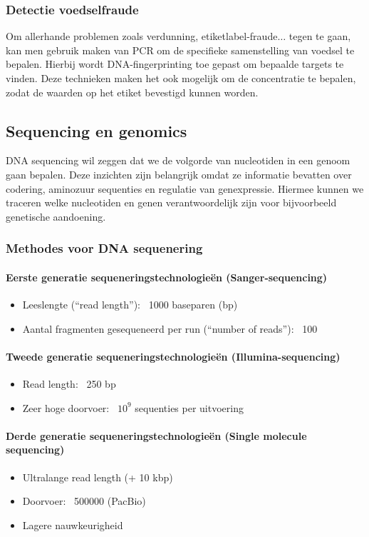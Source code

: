 \documentclass[a4paper,kul]{kulakarticle} %
\begin{document}
\subsubsection{Detectie voedselfraude}
Om allerhande problemen zoals verdunning, etiketlabel-fraude$\ldots$ tegen te gaan, kan men gebruik maken van PCR om de specifieke samenstelling van voedsel te bepalen. Hierbij wordt DNA-fingerprinting toe gepast om bepaalde targets te vinden. Deze technieken maken het ook mogelijk om de concentratie te bepalen, zodat de waarden op het etiket bevestigd kunnen worden. 
\subsection{Sequencing en genomics}
DNA sequencing wil zeggen dat we de volgorde van nucleotiden in een genoom gaan bepalen. Deze inzichten zijn belangrijk omdat ze informatie bevatten over codering, aminozuur sequenties en regulatie van genexpressie. Hiermee kunnen we traceren welke nucleotiden en genen verantwoordelijk zijn voor bijvoorbeeld genetische aandoening.
\subsubsection{Methodes voor DNA sequenering}
\paragraph{Eerste generatie sequeneringstechnologieën (Sanger-sequencing)}
\begin{itemize}
	\item Leeslengte (“read length”): ~1000 baseparen (bp)
	\item Aantal fragmenten gesequeneerd per run (“number of reads”): ~100
\end{itemize}
\paragraph{Tweede generatie sequeneringstechnologieën (Illumina-sequencing)}
\begin{itemize}
	\item Read length: ~250 bp
	\item Zeer hoge doorvoer: ~$10^9$ sequenties per uitvoering
\end{itemize}
\paragraph{Derde generatie sequeneringstechnologieën (Single molecule sequencing)}
\begin{itemize}
	\item Ultralange read length (+ 10 kbp)
	\item Doorvoer: ~\num{500000} (PacBio)
	\item Lagere nauwkeurigheid
\end{itemize}
\end{document}
